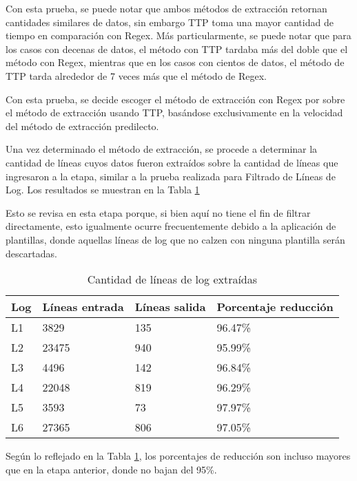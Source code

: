 Con esta prueba, se puede notar que ambos métodos de extracción retornan cantidades similares de datos, sin embargo TTP toma una mayor cantidad de tiempo en comparación con Regex. Más particularmente, se puede notar que para los casos con decenas de datos, el método con TTP tardaba más del doble que el método con Regex, mientras que en los casos con cientos de datos, el método de TTP tarda alrededor de 7 veces más que el método de Regex.

Con esta prueba, se decide escoger el método de extracción con Regex por sobre el método de extracción usando TTP, basándose exclusivamente en la velocidad del método de extracción predilecto.

Una vez determinado el método de extracción, se procede a determinar la cantidad de líneas cuyos datos fueron extraídos sobre la cantidad de líneas que ingresaron a la etapa, similar a la prueba realizada para Filtrado de Líneas de Log. Los resultados se muestran en la Tabla \ref{table:etapa2c2}

Esto se revisa en esta etapa porque, si bien aquí no tiene el fin de filtrar directamente, esto igualmente ocurre frecuentemente debido a la aplicación de plantillas, donde aquellas líneas de log que no calzen con ninguna plantilla serán descartadas.


\begin{table}[h]
    \centering
    \caption{\label{table:etapa2c2} Cantidad de líneas de log extraídas}
    \begin{tabular}{|p{3.5cm}|p{3.5cm}|p{3.5cm}|p{3.5cm}|}
        \hline
        Log & Líneas entrada & Líneas salida & Porcentaje reducción \\
        \hline
        L1 & 3829 & 135 & 96.47\% \\
        \hline
        L2 & 23475 & 940 & 95.99\% \\
        \hline
        L3 & 4496 & 142 & 96.84\% \\
        \hline
        L4 & 22048 & 819 & 96.29\% \\
        \hline
        L5 & 3593 & 73 & 97.97\% \\
        \hline
        L6 & 27365 & 806 & 97.05\% \\
        \hline
    \end{tabular}
\end{table}


Según lo reflejado en la Tabla \ref{table:etapa2c2}, los porcentajes de reducción son incluso mayores que en la etapa anterior, donde no bajan del 95\%.

